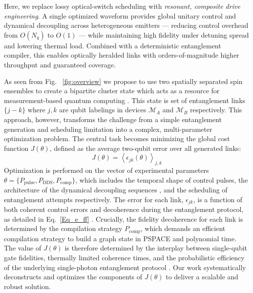 \documentclass[%
 reprint,
 superscriptaddress,
 amsmath,amssymb,
 aps,
 prx,
]{revtex4-2}
\begin{document}
Here, we replace lossy optical-switch scheduling with \emph{resonant, composite drive engineering}. A single optimized waveform provides global unitary control and dynamical decoupling across heterogeneous emitters — reducing control overhead from $O(N_q)$ to $O(1)$ — while maintaining high fidelity under detuning spread and lowering thermal load. Combined with a deterministic entanglement compiler, this enables optically heralded links with orders-of-magnitude higher throughput and guaranteed coverage.


As seen from Fig. ~\ref{fig:overview} we propose to use two spatially separated spin ensembles to create a bipartite cluster state which acts as a resource for measurement-based quantum computing \cite{jozsa2005introductionmeasurementbasedquantum,RevModPhys.79.135}. This state is set of entanglement links $\{j-k\}$ where $j, k$ are qubit labelings in devices $\mathcal{M}_{A}$ and $\mathcal{M}_{B}$ respectively. This approach, however, transforms the challenge from a simple entanglement generation and scheduling \cite{pompili2022experimental,li2024dynamic,ni2025entanglement} limitation into a complex, multi-parameter optimization problem.
The central task becomes minimizing the global cost function $J(\theta)$, defined as the average two-qubit error over all generated links:
\begin{equation}
    J(\theta) = \left\langle \epsilon_{jk}(\theta) \right\rangle_{j,k}
\end{equation}
Optimization is performed on the vector of experimental parameters $\theta = \{ P_{\mathrm{pulse}}, P_{\mathrm{DDS}}, P_{\mathrm{comp}} \}$, which includes the temporal shape of control pulses, the architecture of the dynamical decoupling sequences \cite{Viola_1998,Lucero_2010}, and the scheduling of entanglement attempts respectively. The error for each link, $\epsilon_{jk}$, is a function of both coherent control errors and decoherence during the entanglement protocol, as detailed in Eq.~\ref{Eq_e_ff} . Crucially, the fidelity decoherence for each link is determined by the compilation strategy $P_{\mathrm{comp}}$, which demands an efficient compilation strategy to build a graph state in PSPACE \cite{jain2009qippspace} and polynomial time. The value of $J(\theta)$ is therefore determined by the interplay between single-qubit gate fidelities, thermally limited coherence times, and the probabilistic efficiency of the underlying single-photon entanglement protocol \cite{Hermans_2023}.
Our work systematically deconstructs and optimizes the components of $J(\theta)$ to deliver a scalable and robust solution.
\end{document}
